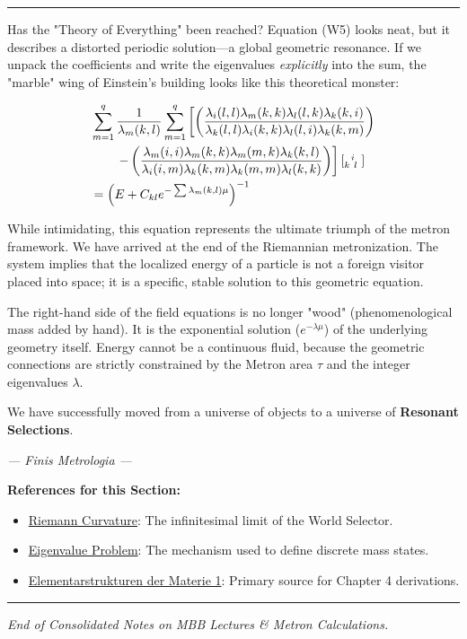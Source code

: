 \documentclass[11pt,a4paper,oneside]{article}
\newcommand{\metroncap}[4][]{%
    \left[ \renewcommand{\arraystretch}{0.85} \substack{#2 \\ #3 \ #4} \right]_{#1}%
}
\newenvironment{sectionrefs}
  {\par\vspace{1em}\noindent\textbf{\textsf{References for this Section:}}\begin{itemize}[leftmargin=*, label={\scriptsize$\blacksquare$}, itemsep=2pt]}
  {\end{itemize}}
\newcommand{\hr}{\par\vspace{2em}\noindent\rule{\linewidth}{0.4pt}\par\vspace{2em}}
\begin{document}
\hr

\begin{reflectionbox}[title={Notes and Reflections: The Marble Building Completed}]
Has the "Theory of Everything" been reached? Equation (W5) looks neat, but it describes a distorted periodic solution—a global geometric resonance. If we unpack the coefficients and write the eigenvalues \textit{explicitly} into the sum, the "marble" wing of Einstein's building looks like this theoretical monster:

\begin{align*}
    &\sum_{m=1}^q \frac{1}{\lambda_m(k, l)} \sum_{m=1}^q \left[ \left( \frac{\lambda_i(l,l)\lambda_m(k, k)\lambda_l(l, k)\lambda_k(k, i)}{\lambda_k(l,l)\lambda_i(k, k)\lambda_l(l, i)\lambda_k(k,m)} \right) \right. \\
    &\qquad \left. - \left( \frac{\lambda_m(i, i)\lambda_m(k, k)\lambda_m(m, k)\lambda_k(k,l)}{\lambda_i(i, m)\lambda_k(k, m)\lambda_k(m, m)\lambda_l(k, k)} \right) \right] \metroncap{i}{k\ l}{ } \\
    &= \left( E + C_{kl}e^{-\sum \lambda_m(k, l) \mu} \right)^{-1}
\end{align*}

While intimidating, this equation represents the ultimate triumph of the metron framework. We have arrived at the end of the Riemannian metronization. The system implies that the localized energy of a particle is not a foreign visitor placed into space; it is a specific, stable solution to this geometric equation.

The right-hand side of the field equations is no longer "wood" (phenomenological mass added by hand). It is the exponential solution ($e^{-\lambda \mu}$) of the underlying geometry itself. Energy cannot be a continuous fluid, because the geometric connections are strictly constrained by the Metron area $\tau$ and the integer eigenvalues $\lambda$. 

We have successfully moved from a universe of objects to a universe of \textbf{Resonant Selections}.

\begin{center}
    \vspace{1em}
    \textit{--- Finis Metrologia ---}
\end{center}
\end{reflectionbox}

\begin{sectionrefs}
    \item \href{https://en.wikipedia.org/wiki/Riemann_curvature_tensor}{Riemann Curvature}: The infinitesimal limit of the World Selector.
    \item \href{https://en.wikipedia.org/wiki/Eigenvalue}{Eigenvalue Problem}: The mechanism used to define discrete mass states.
    \item \href{https://www.imagomundi.biz/bibliothek-2/}{Elementarstrukturen der Materie 1}: Primary source for Chapter 4 derivations.
\end{sectionrefs}

\hr
\begin{center}
    \textit{End of Consolidated Notes on MBB Lectures \& Metron Calculations.}
\end{center}
\end{document}
